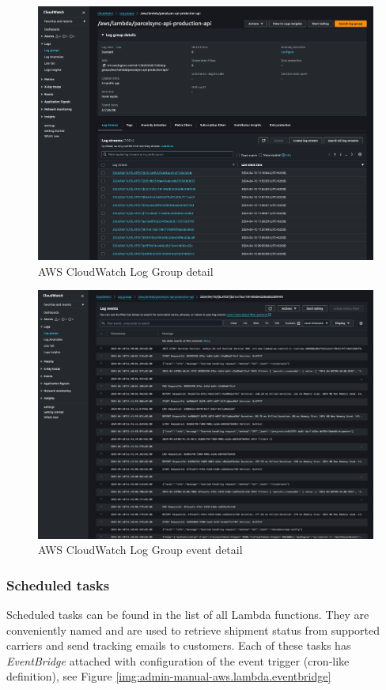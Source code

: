 \begin{figure}[H]\centering
\includegraphics[width=140mm]{img/docs/fig_aws_loggroup.png}
\caption{AWS CloudWatch Log Group detail}
\label{img:admin-manual-aws.lambda.log.detail}
\end{figure}

\begin{figure}[H]\centering
\includegraphics[width=140mm]{img/docs/fig_aws_log_event.png}
\caption{AWS CloudWatch Log Group event detail}
\label{img:admin-manual-aws.lambda.log.event.detail}
\end{figure}

\subsubsection{Scheduled tasks}
Scheduled tasks can be found in the list of all Lambda functions.
They are conveniently named and are used to retrieve shipment status from supported carriers and send tracking emails to customers.
Each of these tasks has \textit{EventBridge} attached with configuration of the event trigger (cron-like definition), see Figure \ref{img:admin-manual-aws.lambda.eventbridge}

